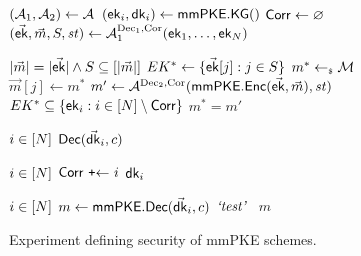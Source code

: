 \begin{figure*}[!tbp]
  \begin{gamebox}{\mmowrcca}\flushleft
    \begin{minipage}[t]{.35\linewidth}
      \begin{algorithmic}
        \State $(\Adv[1],\Adv[2]) \gets \Adv$
        \For{$\idxUser\in[\nUsers]$}
           $(\mmpkepk_\idxUser, \mmpkesk_\idxUser)\gets \mmpkeKeyGenL()$
        \EndFor
        \State $\term{Corr} \gets \emptyset$
        \State $(\vec\mmpkepk, \vec m, S, \mathit{st}) \gets \mathcal A_1^{\text{Dec}_1, \text{Cor}}(\mmpkepk_1, \dots, \mmpkepk_\nUsers)$

        \State \KwReq{} $\abs{\vec m}=\abs{\vec\mmpkepk} \land S \subseteq [\abs{\vec m}]$
        \State $EK^* \gets \{\vec\mmpkepk[j] : j \in S \}$
        \State $m^* \getsr \mathcal M$
          $\vec m[j] \gets m^*$
        \EndFor
        \State $m' \gets \mathcal A^{\text{Dec}_2, \text{Cor}}(\mmpkeEncL(\vec\mmpkepk, \vec m), \mathit{st})$
        \State \KwReq{} $EK^* \subseteq \{\mmpkepk_i : i \in [N] \setminus \term{Corr} \}$
        \State \Return $m^*=m'$
      \end{algorithmic}
    \end{minipage}
    \hfill
    \begin{minipage}[t]{.2\linewidth}
      \begin{algorithmic}
        \State \KwReq{} $\idxUser\in[\nUsers]$
        \State \Return $\mmpkeDec(\vec\mmpkesk_i,c)$
      \end{algorithmic}

      \medskip
      \begin{algorithmic}
        \State \KwReq{} $\idxUser\in[\nUsers]$
        \State $\term{Corr} \setadd \idxUser$
        \State \Return $\mmpkesk_\idxUser$
      \end{algorithmic}
      \end{minipage}\hfill\begin{minipage}[t]{.3\linewidth}
      \begin{algorithmic}
        \State \KwReq{} $\idxUser\in[\nUsers]$
        \State $m \gets \mmpkeDecL(\vec\mmpkesk_i,c)$
          \State \Return $\literal{test}$
        \Else\
          \Return $m$
        \EndIf
      \end{algorithmic}
    \end{minipage}
  \end{gamebox}
  \caption{Experiment defining \mmowrcca security of mmPKE schemes.}
  \label{fig:mmpke_ow_rcca}
\end{figure*}

